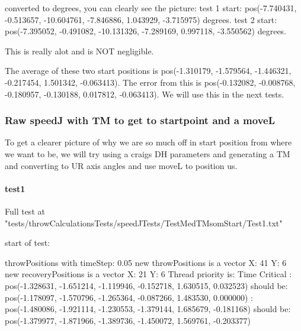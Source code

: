 converted to degrees, you can clearly see the picture:
\newline test 1 start: pos(-7.740431, -0.513657, -10.604761, -7.846886, 1.043929, -3.715975) degrees.
\newline test 2 start: pos(-7.395052, -0.491082, -10.131326, -7.289169, 0.997118, -3.550562) degrees.\newline 

This is really alot and is NOT negligible.

The average of these two start positions is pos(-1.310179, -1.579564, -1.446321, -0.217454, 1.501342, -0.063413). \newline 
The error from this is pos(-0.132082, -0.008768, -0.180957, -0.130188, 0.017812, -0.063413).
\newline We will use this in the next tests.

\subsubsection{Raw speedJ with TM to get to startpoint and a moveL}
To get a clearer picture of why we are so much off in start position from where we want to be, we will try using a craigs DH parameters and generating a TM and converting to UR axis angles and use moveL to position us.

\paragraph{test1}
Full test at "tests/throwCalculationsTests/speedJTests/TestMedTMsomStart/Test1.txt"\newline

start of test:\newline

throwPositions with timeStep:  0.05
\newline new throwPositions is a vector X: 41 Y:  6
\newline new recoveryPositions is a vector X: 21 Y:  6
\newline Thread priority is: Time Critical
\newline [0.000000s - Step 0/41]:
\newline \hspace{1cm}        pos(-1.328631, -1.651214, -1.119946, -0.152718, 1.630515, 0.032523) should be:
\newline \hspace{1cm}        pos(-1.178097, -1.570796, -1.265364, -0.087266, 1.483530, 0.000000)
\newline [2.000000s - Step 40/41]:
\newline \hspace{1cm}        pos(-1.480086, -1.921114, -1.230553, -1.379144, 1.685679, -0.181168) should be:
\newline \hspace{1cm}       pos(-1.379977, -1.871966, -1.389736, -1.450072, 1.569761, -0.203377)\newline 

